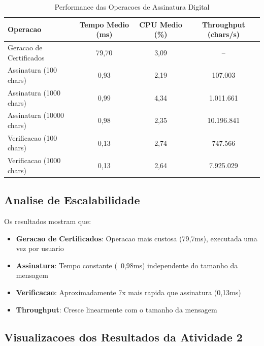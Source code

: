 \documentclass[12pt,a4paper,oneside]{article}
\begin{document}
\begin{table}[H]
\centering
\caption{Performance das Operacoes de Assinatura Digital}
\label{tab:signature_performance}
\begin{tabular}{lccc}
\toprule
\textbf{Operacao} & \textbf{Tempo Medio (ms)} & \textbf{CPU Medio (\%)} & \textbf{Throughput (chars/s)} \\
\midrule
Geracao de Certificados & 79,70 & 3,09 & -- \\
Assinatura (100 chars) & 0,93 & 2,19 & 107.003 \\
Assinatura (1000 chars) & 0,99 & 4,34 & 1.011.661 \\
Assinatura (10000 chars) & 0,98 & 2,35 & 10.196.841 \\
Verificacao (100 chars) & 0,13 & 2,74 & 747.566 \\
Verificacao (1000 chars) & 0,13 & 2,64 & 7.925.029 \\
\bottomrule
\end{tabular}
\end{table}

\subsection{Analise de Escalabilidade}

Os resultados mostram que:

\begin{itemize}
    \item \textbf{Geracao de Certificados}: Operacao mais custosa (79,7ms), executada uma vez por usuario
    \item \textbf{Assinatura}: Tempo constante (~0,98ms) independente do tamanho da mensagem
    \item \textbf{Verificacao}: Aproximadamente 7x mais rapida que assinatura (0,13ms)
    \item \textbf{Throughput}: Cresce linearmente com o tamanho da mensagem
\end{itemize}

\subsection{Visualizacoes dos Resultados da Atividade 2}
\end{document}
